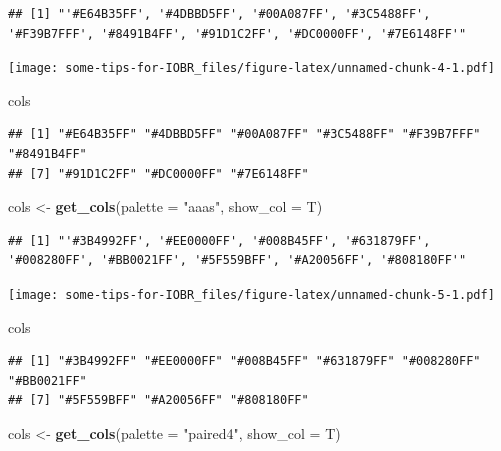 \documentclass[
  12pt,
]{book}
\newenvironment{Shaded}{\begin{snugshade}}{\end{snugshade}}
\newcommand{\AttributeTok}[1]{\textcolor[rgb]{0.13,0.29,0.53}{#1}}
\newcommand{\FunctionTok}[1]{\textcolor[rgb]{0.13,0.29,0.53}{\textbf{#1}}}
\newcommand{\NormalTok}[1]{#1}
\newcommand{\OtherTok}[1]{\textcolor[rgb]{0.56,0.35,0.01}{#1}}
\newcommand{\StringTok}[1]{\textcolor[rgb]{0.31,0.60,0.02}{#1}}
\begin{document}
\begin{verbatim}
## [1] "'#E64B35FF', '#4DBBD5FF', '#00A087FF', '#3C5488FF', '#F39B7FFF', '#8491B4FF', '#91D1C2FF', '#DC0000FF', '#7E6148FF'"
\end{verbatim}

\texttt{[image: some-tips-for-IOBR\_files/figure-latex/unnamed-chunk-4-1.pdf]}

\begin{Shaded}
\begin{Highlighting}[]
\NormalTok{cols}
\end{Highlighting}
\end{Shaded}

\begin{verbatim}
## [1] "#E64B35FF" "#4DBBD5FF" "#00A087FF" "#3C5488FF" "#F39B7FFF" "#8491B4FF"
## [7] "#91D1C2FF" "#DC0000FF" "#7E6148FF"
\end{verbatim}

\begin{Shaded}
\begin{Highlighting}[]
\NormalTok{cols }\OtherTok{\textless{}{-}} \FunctionTok{get\_cols}\NormalTok{(}\AttributeTok{palette =} \StringTok{"aaas"}\NormalTok{, }\AttributeTok{show\_col =}\NormalTok{ T)}
\end{Highlighting}
\end{Shaded}

\begin{verbatim}
## [1] "'#3B4992FF', '#EE0000FF', '#008B45FF', '#631879FF', '#008280FF', '#BB0021FF', '#5F559BFF', '#A20056FF', '#808180FF'"
\end{verbatim}

\texttt{[image: some-tips-for-IOBR\_files/figure-latex/unnamed-chunk-5-1.pdf]}

\begin{Shaded}
\begin{Highlighting}[]
\NormalTok{cols}
\end{Highlighting}
\end{Shaded}

\begin{verbatim}
## [1] "#3B4992FF" "#EE0000FF" "#008B45FF" "#631879FF" "#008280FF" "#BB0021FF"
## [7] "#5F559BFF" "#A20056FF" "#808180FF"
\end{verbatim}

\begin{Shaded}
\begin{Highlighting}[]
\NormalTok{cols }\OtherTok{\textless{}{-}} \FunctionTok{get\_cols}\NormalTok{(}\AttributeTok{palette =} \StringTok{"paired4"}\NormalTok{, }\AttributeTok{show\_col =}\NormalTok{ T)}
\end{Highlighting}
\end{Shaded}
\end{document}
